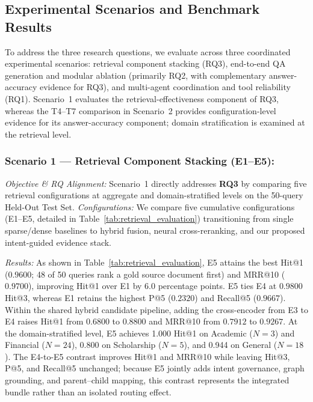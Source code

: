 \subsection{Experimental Scenarios and Benchmark Results}
\label{sec:scenarios}

To address the three research questions, we evaluate \system{} across three coordinated experimental scenarios: retrieval component stacking (RQ3), end-to-end QA generation and modular ablation (primarily RQ2, with complementary answer-accuracy evidence for RQ3), and multi-agent coordination and tool reliability (RQ1). Scenario~1 evaluates the retrieval-effectiveness component of RQ3, whereas the T4--T7 comparison in Scenario~2 provides configuration-level evidence for its answer-accuracy component; domain stratification is examined at the retrieval level.

\subsubsection{Scenario 1 --- Retrieval Component Stacking (E1--E5):}
\emph{Objective \& RQ Alignment:} Scenario~1 directly addresses \textbf{RQ3} by comparing five retrieval configurations at aggregate and domain-stratified levels on the 50-query Held-Out Test Set.
\emph{Configurations:} We compare five cumulative configurations (E1--E5, detailed in Table~\ref{tab:retrieval_evaluation}) transitioning from single sparse/dense baselines to hybrid fusion, neural cross-reranking, and our proposed intent-guided evidence stack.

\emph{Results:} As shown in Table~\ref{tab:retrieval_evaluation}, E5 attains the best Hit@1 ($0.9600$; 48 of 50 queries rank a gold source document first) and MRR@10 ($0.9700$), improving Hit@1 over E1 by 6.0 percentage points. E5 ties E4 at $0.9800$ Hit@3, whereas E1 retains the highest P@5 ($0.2320$) and Recall@5 ($0.9667$). Within the shared hybrid candidate pipeline, adding the cross-encoder from E3 to E4 raises Hit@1 from $0.6800$ to $0.8800$ and MRR@10 from $0.7912$ to $0.9267$. At the domain-stratified level, E5 achieves 1.000 Hit@1 on Academic ($N=3$) and Financial ($N=24$), 0.800 on Scholarship ($N=5$), and 0.944 on General ($N=18$). The E4-to-E5 contrast improves Hit@1 and MRR@10 while leaving Hit@3, P@5, and Recall@5 unchanged; because E5 jointly adds intent governance, graph grounding, and parent--child mapping, this contrast represents the integrated bundle rather than an isolated routing effect.


